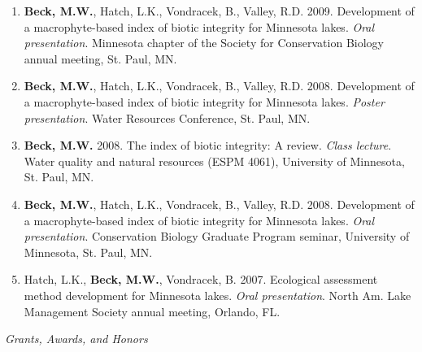 \documentclass[letterpaper,12pt]{article}
\newcommand{\sectitle}[1]{\vspace{\baselineskip} \centerline{\large{\textit{#1}}}}
\begin{document}
\begin{enumerate}
\item {\bf Beck, M.W.}, Hatch, L.K., Vondracek, B., Valley, R.D. 2009. Development of a macrophyte-based index of biotic integrity for Minnesota lakes. \textit{Oral presentation}. Minnesota chapter of the Society for Conservation Biology annual meeting, St. Paul, MN.

\item {\bf Beck, M.W.}, Hatch, L.K., Vondracek, B., Valley, R.D. 2008. Development of a macrophyte-based index of biotic integrity for Minnesota lakes. \textit{Poster presentation}. Water Resources Conference, St. Paul, MN.

\item {\bf Beck, M.W.} 2008. The index of biotic integrity: A review. \textit{Class lecture}. Water quality and natural resources (ESPM 4061), University of Minnesota, St. Paul, MN.

\item {\bf Beck, M.W.}, Hatch, L.K., Vondracek, B., Valley, R.D. 2008. Development of a macrophyte-based index of biotic integrity for Minnesota lakes. \textit{Oral presentation}. Conservation Biology Graduate Program seminar, University of Minnesota, St. Paul, MN.

\item Hatch, L.K., {\bf Beck, M.W.}, Vondracek, B. 2007. Ecological assessment method development for Minnesota lakes. \textit{Oral presentation}. North Am. Lake Management Society annual meeting, Orlando, FL.

\end{enumerate}

\sectitle{Grants, Awards, and Honors}
\end{document}

